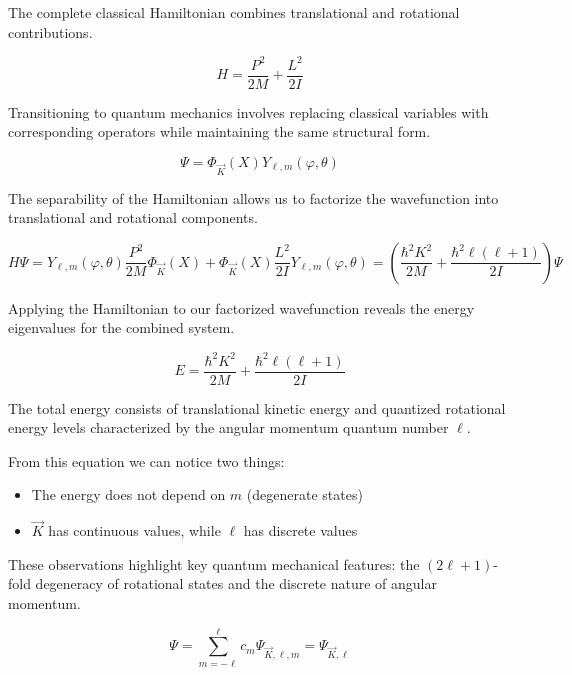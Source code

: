 The complete classical Hamiltonian combines translational and rotational contributions.

\begin{equation}
H=\frac{P^{2}}{2 M}+\frac{L^{2}}{2 I}
\end{equation}

Transitioning to quantum mechanics involves replacing classical variables with corresponding operators while maintaining the same structural form.

\begin{equation}
\Psi=\Phi_{\vec{K}}(X) Y_{\ell, m}(\varphi, \theta)
\end{equation}

The separability of the Hamiltonian allows us to factorize the wavefunction into translational and rotational components.

\begin{equation}
H \Psi=Y_{\ell, m}(\varphi, \theta) \frac{P^{2}}{2 M} \Phi_{\vec{K}}(X)+\Phi_{\vec{K}}(X) \frac{L^{2}}{2 I} Y_{\ell, m}(\varphi, \theta)=\left(\frac{\hbar^{2} K^{2}}{2 M}+\frac{\hbar^{2} \ell(\ell+1)}{2 I}\right) \Psi
\end{equation}

Applying the Hamiltonian to our factorized wavefunction reveals the energy eigenvalues for the combined system.

\begin{equation}
E=\frac{\hbar^{2} K^{2}}{2 M}+\frac{\hbar^{2} \ell(\ell+1)}{2 I}
\end{equation}

The total energy consists of translational kinetic energy and quantized rotational energy levels characterized by the angular momentum quantum number $\ell$.

From this equation we can notice two things:

\begin{itemize}
  \item The energy does not depend on $m$ (degenerate states)
  \item $\vec{K}$ has continuous values, while $\ell$ has discrete values
\end{itemize}

These observations highlight key quantum mechanical features: the $(2\ell+1)$-fold degeneracy of rotational states and the discrete nature of angular momentum.

\begin{equation}
\Psi=\sum_{m=-\ell}^{\ell} c_{m} \Psi_{\vec{K}, \ell, m}=\Psi_{\vec{K}, \ell}
\end{equation}

